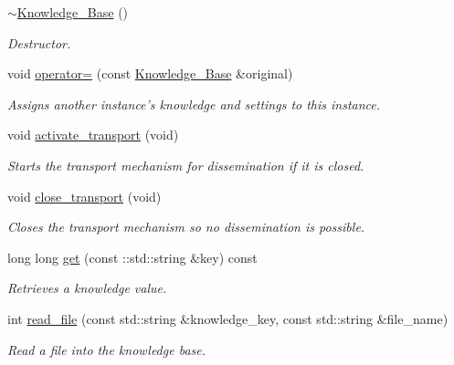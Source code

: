 \begin{DoxyCompactItemize}
\hyperlink{classMadara_1_1Knowledge__Engine_1_1Knowledge__Base_ab1e6aa7f2eba9f320c59f49a07d1c488}{$\sim$Knowledge\_\-Base} ()
\begin{DoxyCompactList}\small\item\em Destructor. \item\end{DoxyCompactList}\item 
void \hyperlink{classMadara_1_1Knowledge__Engine_1_1Knowledge__Base_a2e04a387be8c8b1e9eab87dbca25973c}{operator=} (const \hyperlink{classMadara_1_1Knowledge__Engine_1_1Knowledge__Base}{Knowledge\_\-Base} \&original)
\begin{DoxyCompactList}\small\item\em Assigns another instance's knowledge and settings to this instance. \item\end{DoxyCompactList}\item 
void \hyperlink{classMadara_1_1Knowledge__Engine_1_1Knowledge__Base_afef2bc133696e30644b611b1a813e69f}{activate\_\-transport} (void)
\begin{DoxyCompactList}\small\item\em Starts the transport mechanism for dissemination if it is closed. \item\end{DoxyCompactList}\item 
void \hyperlink{classMadara_1_1Knowledge__Engine_1_1Knowledge__Base_a7198b302a8dbc910a7baa3121c964bfc}{close\_\-transport} (void)
\begin{DoxyCompactList}\small\item\em Closes the transport mechanism so no dissemination is possible. \item\end{DoxyCompactList}\item 
long long \hyperlink{classMadara_1_1Knowledge__Engine_1_1Knowledge__Base_af7e85b45b76a4401ef0665802843b87d}{get} (const ::std::string \&key) const 
\begin{DoxyCompactList}\small\item\em Retrieves a knowledge value. \item\end{DoxyCompactList}\item 
int \hyperlink{classMadara_1_1Knowledge__Engine_1_1Knowledge__Base_a9986ccffb9186938e1cd63ce3aaffd52}{read\_\-file} (const std::string \&knowledge\_\-key, const std::string \&file\_\-name)
\begin{DoxyCompactList}\small\item\em Read a file into the knowledge base. \item\end{DoxyCompactList}\item 

\end{DoxyCompactItemize}

